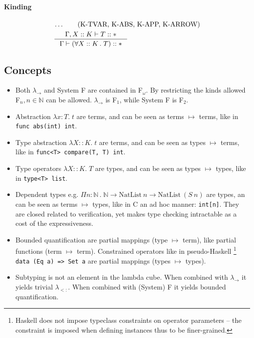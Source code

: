 \documentclass{article}
\newcommand{\lamt}[3]{\lambda #1: #2 .\;#3}
\newcommand{\lamk}[3]{\lambda #1 :: #2 .\;#3}
\newcommand{\uquant}[2]{\forall #1 \, .\; #2}
\begin{document}
\paragraph{Kinding}
  \begin{align*}
    & \ldots \tag{K-TVAR, K-ABS, K-APP, K-ARROW}\\
    & \inference
      {\Gamma, X::K \vdash T :: *}
      {\Gamma\vdash (\uquant{X::K}{T}) :: *}
  \end{align*}

\subsection{Concepts}
  \begin{itemize}
    \item Both $\lambda_{\to}$ and System F are contained in F$_\omega$.
      By restricting the kinds allowed F$_n, n\in\mathbb{N}$ can be allowed.
      $\lambda_{\to}$ is F$_1$, while System F is F$_2$.
    \item Abstraction $\lamt{x}{T}{t}$ are terms, and can be seen as terms $\mapsto$ terms, like in \verb|func abs(int) int|.
    \item Type abstraction $\lamk{X}{K}{t}$ are terms, and can be seen as types $\mapsto$ terms, like in \verb|func<T> compare(T, T) int|.
    \item Type operators $\lamk{X}{K}{T}$ are types, and can be seen as types $\mapsto$ types, like in \verb|type<T> list|.
    \item Dependent types e.g. $\Pi n:\mathbb{N}\, .\;\mathbb{N}\to \mathrm{NatList}~n \to \mathrm{NatList}~(S~n)$ are types,
      an can be seen as terms $\mapsto$ types, like in C an ad hoc manner: \verb|int[n]|.
      They are closed related to verification, yet makes type checking intractable as a cost of the expressiveness.
    \item Bounded quantification are partial mappings (type $\mapsto$ term), like partial functions (term $\mapsto$ term).
      Constrained operators like in pseudo-Haskell
      \footnote{Haskell does not impose typeclass constraints on operator
      parameters -- the constraint is imposed when defining instances thus to
      be finer-grained.}
      \verb|data (Eq a) => Set a| are partial mappings (types $\mapsto$ types).
    \item Subtyping is not an element in the lambda cube.
      When combined with $\lambda_{\to}$ it yields trivial $\lambda_{<:}$.
      When combined with (System) F it yields bounded quantification.
  \end{itemize}
\end{document}

